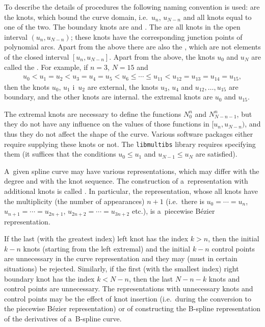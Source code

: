 \vspace{\medskipamount}
\begin{sloppypar}
To describe the details of procedures the following naming
convention is used:  are the knots, which bound
the curve domain, i.e.\ $u_n$, $u_{N-n}$ and all knots equal to one of the two.
The boundary knots are  and . The 
are all knots in the open interval $(u_n,u_{N-n})$; these knots have
the corresponding junction points of polynomial arcs. Apart from the above
there are also the , which are not elements of
the closed interval $[u_n,u_{N-n}]$.
Apart from the above, the knots $u_0$ and $u_N$ are called the .
For example, if $n=3$, $N=15$ and
\begin{align*}
  u_0<u_1=u_2<u_3=u_4=u_5<u_6\leq\cdots\leq u_{11}<u_{12}=u_{13}=u_{14}=u_{15},
\end{align*}
then the knots $u_0$, $u_1$ i~$u_2$ are external, the knots $u_3$, $u_4$
and $u_{12},\ldots,u_{15}$ are boundary, and the other knots
are internal. the extremal knots are $u_0$ and $u_{15}$.
\end{sloppypar}

The extremal knots are necessary to define the functions
$N^n_0$ and $N^n_{N-n-1}$, but they do not have any influence on the
values of those functions in $[u_n,u_{N-n})$, and thus they do not affect
the shape of the curve. Various software packages either require supplying these
knots or not. The \texttt{libmultibs} library requires specifying them
(it suffices that the conditions $u_0\leq u_1$ and $u_{N-1}\leq u_N$ are
satisfied).

\vspace{\medskipamount}
A~given spline curve may have various representations, which may differ
with the degree and with the knot sequence. The construction of a~representation
with additional knots is called . In particular,
the representation, whose all knots have the multiplicity (the number of
appearances) $n+1$ (i.e.\ there is $u_0=\cdots=u_n$, $u_{n+1}=\cdots=u_{2n+1}$,
 $u_{2n+2}=\cdots=u_{3n+2}$ etc.), is a~piecewise B\'{e}zier representation.

If the last (with the greatest index) left knot has the index
$k>n$, then the initial $k-n$ knots (starting from the left extremal)
and the initial $k-n$ control points are unnecessary in the curve
representation and they may (must in certain situations) be rejected.
Similarly, if the first (with the smallest index) right boundary knot
has the index $k<N-n$, then the last $N-n-k$ knots and control points
are unnecessary. The representations with unnecessary knots and control points
may be the effect of knot insertion (i.e.\ during the conversion to the piecewise
B\'{e}zier representation) or of constructing the B-spline representation
of the derivatives of a~B-spline curve.

